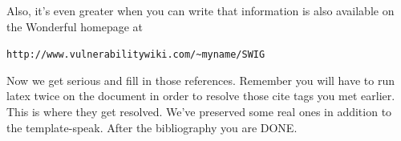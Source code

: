 \documentclass[letterpaper,twocolumn,10pt]{article}
\begin{document}
Also, it's even greater when you can write that information is also 
available on the Wonderful homepage at 

\begin{center}
{\tt http://www.vulnerabilitywiki.com/\~{}myname/SWIG}
\end{center}

Now we get serious and fill in those references.  Remember you will
have to run latex twice on the document in order to resolve those
cite tags you met earlier.  This is where they get resolved.
We've preserved some real ones in addition to the template-speak.
After the bibliography you are DONE.

{\footnotesize 
}


\theendnotes
\end{document}
